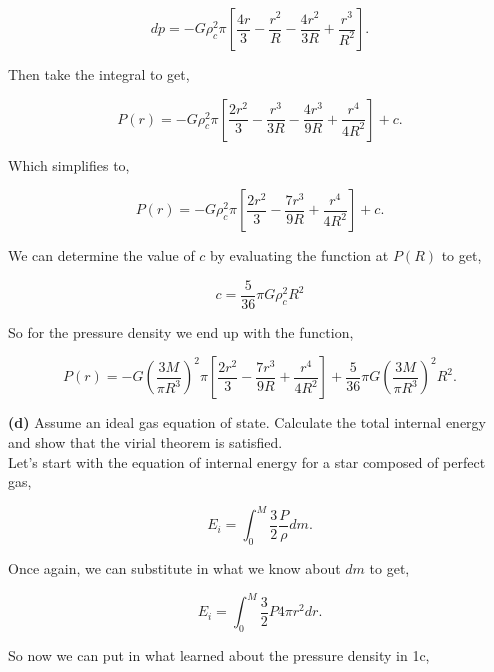 \documentclass[12pt]{article}
\begin{document}
\begin{equation}
dp = -G\rho_c^2\pi \left[\frac{4r}{3}  - \frac{r^2}{R} - \frac{4r^2}{3R} + \frac{r^3}{R^2}\right].
\end{equation}

\noindent Then take the integral to get,

\begin{equation}
P\left( r \right) = -G\rho_c^2\pi \left[\frac{2r^2}{3}  - \frac{r^3}{3R} - \frac{4r^3}{9R} + \frac{r^4}{4R^2}\right] + c.
\end{equation}

\noindent Which simplifies to,

\begin{equation}
P\left( r \right)  = -G\rho_c^2\pi \left[\frac{2r^2}{3}  - \frac{7r^3}{9R} + \frac{r^4}{4R^2}\right] + c.
\end{equation}

\noindent We can determine the value of $c$ by evaluating the function at $P\left( R\right)$ to get,

\begin{equation}
c = \frac{5}{36}\pi G \rho_c^2R^2
\end{equation}

\noindent So for the pressure density we end up with the function, 

\begin{equation}
P\left( r \right)  = -G\left( \frac{3M}{\pi R^3}\right)^2\pi \left[\frac{2r^2}{3}  - \frac{7r^3}{9R} + \frac{r^4}{4R^2}\right] + \frac{5}{36}\pi G \left(\frac{3M}{\pi R^3} \right)^2R^2.
\end{equation}

\noindent \textbf{(d)} Assume an ideal gas equation of state. Calculate the total internal energy and show that the virial theorem is satisfied.\\

\noindent Let's start with the equation of internal energy for a star composed of perfect gas,

\begin{equation}
E_i = \int_0^M \frac{3}{2}\frac{P}{\rho} dm.
\end{equation}

\noindent Once again, we can substitute in what we know about $dm$ to get,

\begin{equation}
E_i = \int_0^M \frac{3}{2}P4\pi r^2dr.
\end{equation}

\noindent So now we can put in what learned about the pressure density in 1c,
\end{document}
